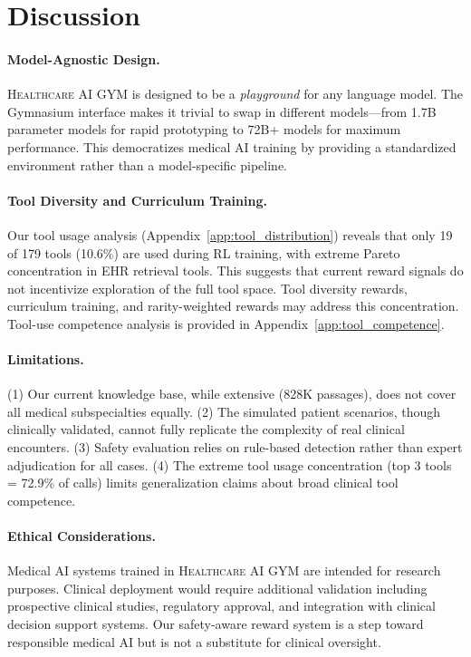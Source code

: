 \documentclass{article}
\newcommand{\gym}{\textsc{Healthcare AI GYM}}
\begin{document}
\section{Discussion}
\label{sec:discussion}

\paragraph{Model-Agnostic Design.}
\gym{} is designed to be a \emph{playground} for any language model. The Gymnasium interface makes it trivial to swap in different models---from 1.7B parameter models for rapid prototyping to 72B+ models for maximum performance. This democratizes medical AI training by providing a standardized environment rather than a model-specific pipeline.

\paragraph{Tool Diversity and Curriculum Training.}
Our tool usage analysis (Appendix~\ref{app:tool_distribution}) reveals that only 19 of 179 tools (10.6\%) are used during RL training, with extreme Pareto concentration in EHR retrieval tools. This suggests that current reward signals do not incentivize exploration of the full tool space. Tool diversity rewards, curriculum training, and rarity-weighted rewards may address this concentration. Tool-use competence analysis is provided in Appendix~\ref{app:tool_competence}.

\paragraph{Limitations.}
(1) Our current knowledge base, while extensive (828K passages), does not cover all medical subspecialties equally. (2) The simulated patient scenarios, though clinically validated, cannot fully replicate the complexity of real clinical encounters. (3) Safety evaluation relies on rule-based detection rather than expert adjudication for all cases. (4) The extreme tool usage concentration (top 3 tools = 72.9\% of calls) limits generalization claims about broad clinical tool competence.

\paragraph{Ethical Considerations.}
Medical AI systems trained in \gym{} are intended for research purposes. Clinical deployment would require additional validation including prospective clinical studies, regulatory approval, and integration with clinical decision support systems. Our safety-aware reward system is a step toward responsible medical AI but is not a substitute for clinical oversight.
\end{document}
